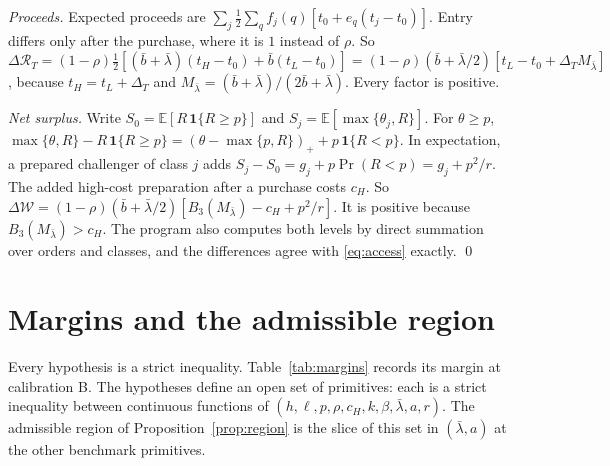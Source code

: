 \documentclass[12pt]{article}
\theoremstyle{definition}
\theoremstyle{remark}
\newcommand{\E}{\mathbb E}
\newcommand{\DT}{\Delta_T}
\newcommand{\lb}{\bar\lambda}
\begin{document}
\emph{Proceeds.} Expected proceeds are $\sum_j\frac12\sum_qf_j(q)[t_0+e_q(t_j-t_0)]$. Entry differs only after the
purchase, where it is $1$ instead of $\rho$. So
$\Delta\mathcal R_T=(1-\rho)\frac12[(\bar b+\lb)(t_H-t_0)+\bar b(t_L-t_0)]=(1-\rho)(\bar b+\lb/2)[t_L-t_0+\DT M_{\lb}]$,
because $t_H=t_L+\DT$ and $M_{\lb}=(\bar b+\lb)/(2\bar b+\lb)$. Every factor is positive.

\emph{Net surplus.} Write $S_0=\E[R\,\mathbf 1\{R\ge p\}]$ and $S_j=\E[\max\{\theta_j,R\}]$. For $\theta\ge p$,
$\max\{\theta,R\}-R\,\mathbf 1\{R\ge p\}=(\theta-\max\{p,R\})_++p\,\mathbf 1\{R<p\}$. In expectation, a prepared
challenger of class $j$ adds $S_j-S_0=g_j+p\Pr(R<p)=g_j+p^2/r$. The added high-cost
preparation after a purchase costs $c_H$. So
$\Delta\mathcal W=(1-\rho)(\bar b+\lb/2)[B_3(M_{\lb})-c_H+p^2/r]$. It is positive because
$B_3(M_{\lb})>c_H$. The program also computes both levels by direct summation over orders and classes, and the
differences agree with \eqref{eq:access} exactly. \qed

\section{Margins and the admissible region}\label{sec:margins}

Every hypothesis is a strict inequality. Table~\ref{tab:margins} records its margin at calibration B. The
hypotheses define an open set of primitives: each is a strict inequality between continuous functions of
$(h,\ell,p,\rho,c_H,k,\beta,\lb,a,r)$. The admissible region of Proposition~\ref{prop:region} is the slice of this set
in $(\lb,a)$ at the other benchmark primitives.
\end{document}
